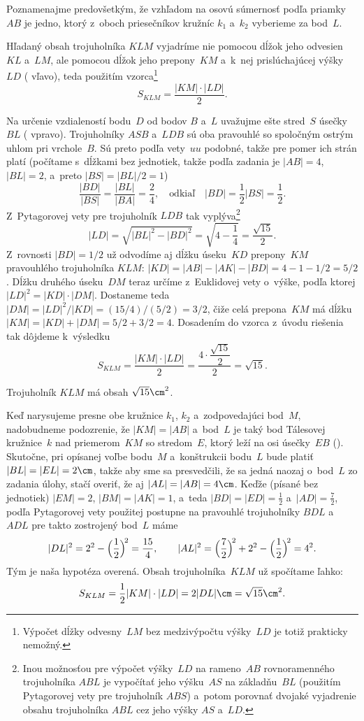 {%
Poznamenajme predovšetkým, že vzhľadom na osovú
súmernosť podľa priamky~$AB$ je jedno, ktorý z~oboch priesečníkov
kružníc $k_1$ a~$k_2$ vyberieme za bod~$L$.

Hľadaný obsah trojuholníka $KLM$ vyjadríme nie pomocou dĺžok jeho
odvesien $KL$ a~$LM$, ale pomocou dĺžok jeho prepony~$KM$ a~k~nej
prislúchajúcej výšky~$LD$ (\obr{} vľavo), teda použitím
vzorca\footnote{Výpočet dĺžky odvesny~$LM$ bez medzivýpočtu výšky~$LD$
je totiž prakticky nemožný.}
$$
S_{KLM}=\frac{|KM|\cdot|LD|}{2}.
$$
%

Na určenie vzdialeností bodu~$D$ od bodov $B$ a~$L$
uvažujme ešte stred~$S$ úsečky~$BL$ ( vpravo). Trojuholníky
$ASB$ a~$LDB$ sú oba pravouhlé so spoločným ostrým uhlom pri vrchole~$B$.
Sú preto podľa vety~$uu$ podobné, takže pre pomer ich strán platí
(počítame s~dĺžkami bez jednotiek, takže podľa zadania je
$|AB|=4$, $|BL|=2$, a~preto $|BS|=|BL|/2=1$)
$$
\frac{|BD|}{|BS|}=\frac{|BL|}{|BA|}=\frac{2}{4},
\quad\text{odkiaľ}\quad |BD|=\frac{1}{2}|BS|=\frac{1}{2}.
$$
Z~Pytagorovej vety pre trojuholník $LDB$ tak
vyplýva\footnote{Inou možnosťou pre výpočet výšky~$LD$ na rameno~$AB$
rovnoramenného trojuholníka $ABL$ je vypočítať jeho výšku~$AS$
na základňu~$BL$ (použitím Pytagorovej vety pre trojuholník $ABS$)
a~potom porovnať dvojaké vyjadrenie obsahu trojuholníka $ABL$
cez jeho výšky $AS$ a~$LD$.}
$$
|LD|=\sqrt{|BL|^2-|BD|^2}=\sqrt{4-\frac14}=\frac{\sqrt{15}}{2}.
$$
Z~rovnosti $|BD|=1/2$ už odvodíme aj dĺžku úseku~$KD$
prepony~$KM$ pravouhlého trojuholníka $KLM$:
$|KD|=|AB|-|AK|-|BD|=4-1-1/2=5/2$. Dĺžku druhého úseku~$DM$ teraz určíme
z~Euklidovej vety o~výške, podľa ktorej
$|LD|^2=|KD|\cdot|DM|$.
Dostaneme teda $|DM|=|LD|^2/|KD|=(15/4)/(5/2)=3/2$, čiže celá
prepona~$KM$ má dĺžku $|KM|=|KD|+|DM|=5/2+3/2=4$. Dosadením do
vzorca z~úvodu riešenia tak dôjdeme k~výsledku
$$
S_{KLM}=\frac{|KM|\cdot|LD|}{2}=
\frac{4\cdot\dfrac{\sqrt{15}}{2}}{2}=\sqrt{15}.
$$

\odpoved
Trojuholník $KLM$ má obsah $\sqrt{15}\cm^2$.

\ineriesenie
Keď narysujeme presne obe kružnice $k_1$, $k_2$ a~zodpovedajúci bod~$M$,
nadobudneme podozrenie, že $|KM|=|AB|$ a~bod~$L$ je taký bod Tálesovej kružnice~$k$
nad priemerom~$KM$ so stredom~$E$, ktorý leží na osi úsečky~$EB$ (\obr).
%
Skutočne, pri opísanej voľbe bodu~$M$ a~konštrukcii bodu~$L$ bude platiť $|BL|=|EL|=2\cm$,
takže aby sme sa presvedčili, že sa jedná naozaj o~bod~$L$ zo zadania úlohy,
stačí overiť, že aj $|AL|=|AB|=4\cm$. Keďže (písané bez jednotiek)
$|EM|=2$, $|BM|=|AK|=1$, a~teda $|BD|=|ED|=\frac12$ a~$|AD|=\frac72$,
podľa Pytagorovej vety použitej postupne na pravouhlé trojuholníky $BDL$ a~$ADL$
pre takto zostrojený bod~$L$ máme
$$
|DL|^2=2^2-\Big({1\over2}\Big)^{\!2}=\frac{15}4,\qquad
|AL|^2=\Big({7\over2}\Big)^{\!2}+2^2-\Big({1\over2}\Big)^{\!2}=4^2.
$$
Tým je naša hypotéza overená. Obsah trojuholníka~$KLM$ už spočítame ľahko:
$$
S_{KLM}=\frac12{|KM|\cdot|LD|}=2|DL|\cm =\sqrt{15}\cm^2.
$$


}
